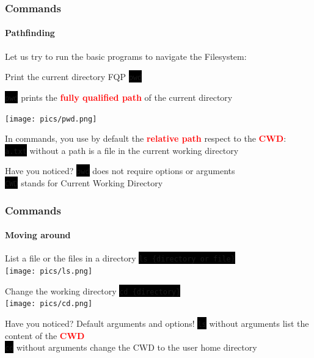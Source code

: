 \documentclass[unknownkeysallowed, 10pt, a4 paper, handout]{beamer}
\newcommand{\focus}[1]{\textbf{\textcolor{red}{#1}}}
\newcommand{\code}[1]{\colorbox{black}{\color{green}\texttt{#1}}}
\begin{document}
\begin{frame}[c]
  \frametitle{Commands}
  \framesubtitle{Pathfinding}

  Let us try to run the basic programs to navigate the Filesystem:
  \begin{exampleblock}{Print the current directory FQP}
    \code{pwd}
  \end{exampleblock}

  \code{pwd} prints the \focus{fully qualified path} of the current directory
  \begin{exampleblock}{}
    \begin{center}
    \texttt{[image: pics/pwd.png]}
    \end{center}
  \end{exampleblock}

  In commands, you use by default the \focus{relative path} respect to
  the \focus{CWD}: \\
  \code{a.txt} without a path is a file in the current working directory

  \begin{alertblock}{Have you noticed?}
    \code{pwd} does not require options or arguments\\
    \code{CWD} stands for Current Working Directory
  \end{alertblock}{}
\end{frame}


\begin{frame}[c]
  \frametitle{Commands}
  \framesubtitle{Moving around}

  \begin{exampleblock}{List a file or the files in a directory}
    \code{ls \{directory or file\}} \\
    \texttt{[image: pics/ls.png]}
  \end{exampleblock}

  \begin{exampleblock}{Change the working directory}
    \code{cd \{directory\}} \\
    \texttt{[image: pics/cd.png]}
  \end{exampleblock}

  \begin{alertblock}{Have you noticed? Default arguments and options!}
     \code{ls} without arguments list the content of the \focus{CWD}\\    
     \code{cd} without arguments change the CWD to the user home directory
  \end{alertblock}

\end{frame}
\end{document}

